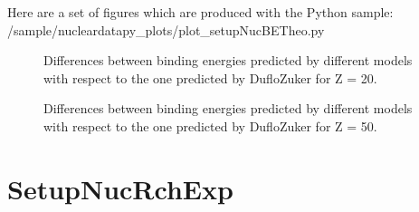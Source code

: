 \documentclass[letterpaper,10pt,english]{sphinxmanual}
\begin{document}
\sphinxAtStartPar
Here are a set of figures which are produced with the Python sample: /sample/nucleardatapy\_plots/plot\_setupNucBETheo.py

\begin{figure}[htbp]
\centering
\capstart

\noindent{}
\caption{Differences between binding energies predicted by different models with respect to the one predicted by Duflo\sphinxhyphen{}Zuker for Z = 20.}\label{\detokenize{source/api/setup_nuc_be_theo:id1}}\end{figure}

\begin{figure}[htbp]
\centering
\capstart

\noindent{}
\caption{Differences between binding energies predicted by different models with respect to the one predicted by Duflo\sphinxhyphen{}Zuker for Z = 50.}\label{\detokenize{source/api/setup_nuc_be_theo:id2}}\end{figure}

\sphinxstepscope


\section{SetupNucRchExp}
\label{\detokenize{source/api/setup_nuc_rch_exp:setupnucrchexp}}\label{\detokenize{source/api/setup_nuc_rch_exp::doc}}\label{\detokenize{source/api/setup_nuc_rch_exp:module-nucleardatapy.setup_nuc_rch_exp}}
\end{document}
